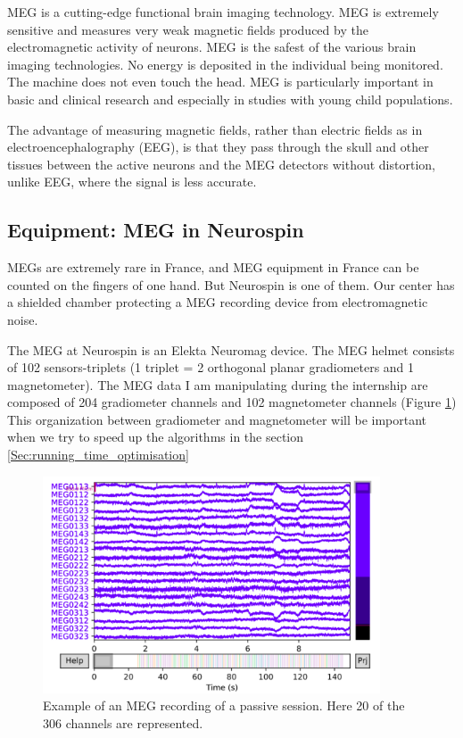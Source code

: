 MEG is a cutting-edge functional brain imaging technology. MEG is extremely sensitive and measures very weak magnetic fields produced by the electromagnetic activity of neurons. MEG is the safest of the various brain imaging technologies. No energy is deposited in the individual being monitored. The machine does not even touch the head.  MEG is particularly important in basic and clinical research and especially in studies with young child populations.

The advantage of measuring magnetic fields, rather than electric fields as in electroencephalography (EEG), is that they pass through the skull and other tissues between the active neurons and the MEG detectors without distortion, unlike EEG, where the signal is less accurate.

\subsection{Equipment: MEG in Neurospin}

MEGs are extremely rare in France, and MEG equipment in France can be counted on the fingers of one hand. But Neurospin is one of them. Our center has a shielded chamber protecting a MEG recording device from electromagnetic noise.

The MEG at Neurospin is an Elekta Neuromag device. The MEG helmet consists of 102 sensors-triplets (1 triplet = 2 orthogonal planar gradiometers and 1 magnetometer). The MEG data I am manipulating during the internship are composed of 204 gradiometer channels and 102 magnetometer channels (Figure \ref{raw_data}) This organization between gradiometer and magnetometer will be important when we try to speed up the algorithms in the section \ref{Sec:running_time_optimisation}

\begin{figure}[ht]
    \centering
    \includegraphics[width=10cm]{images_report/preprocessing/raw_data/Example_of_MEG_recording_reduced.png}
    \caption{Example of an MEG recording of a passive session. Here 20 of the 306 channels are represented.}
    \label{raw_data}
\end{figure}


